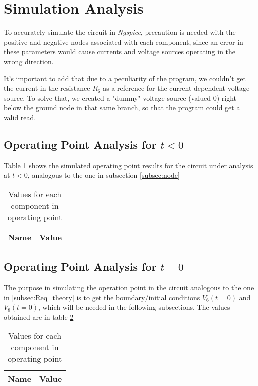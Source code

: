 \section{Simulation Analysis}
\label{sec:simulation}

To accurately simulate the circuit in \textit{Ngspice}, precaution is needed with the positive and negative nodes associated with each component, since an error in these parameters would cause currents and voltage sources operating in the wrong direction.

It's important to add that due to a peculiarity of the program, we couldn't get the current in the resistance $R_6$ as a reference for the current dependent voltage source. To solve that, we created a "dummy" voltage source (valued 0) right below the ground node in that same branch, so that the program could get a valid read.


\subsection{Operating Point Analysis for $t<0$}
\label{subsec:OP_t<0}

Table \ref{tabopS} shows the simulated operating point results for the circuit under analysis at $t<0$, analogous to the one in subsection \ref{subsec:node}

\begin{table}[!ht]
  \centering
  \begin{tabular}{|l|r|}
    \hline    
    {\bf Name} & {\bf Value} \\ \hline
    
  \end{tabular}
  \caption{Values for each component in operating point}
  \label{tabopS}
\end{table}

\newpage

\subsection{Operating Point Analysis for $t=0$}
\label{subsec:OP_t=0}


The purpose in simulating the operation point in the circuit analogous to the one in \ref{subsec:Req_theory} is to get the boundary/initial conditions $V_6(t=0)$ and $V_8(t=0)$, which will be needed in the following subsections. The values obtained are in table \ref{tabop2S}

\begin{table}[!ht]
  \centering
  \begin{tabular}{|l|r|}
    \hline    
    {\bf Name} & {\bf Value} \\ \hline
    
  \end{tabular}
  \caption{Values for each component in operating point}
  \label{tabop2S}
\end{table}

